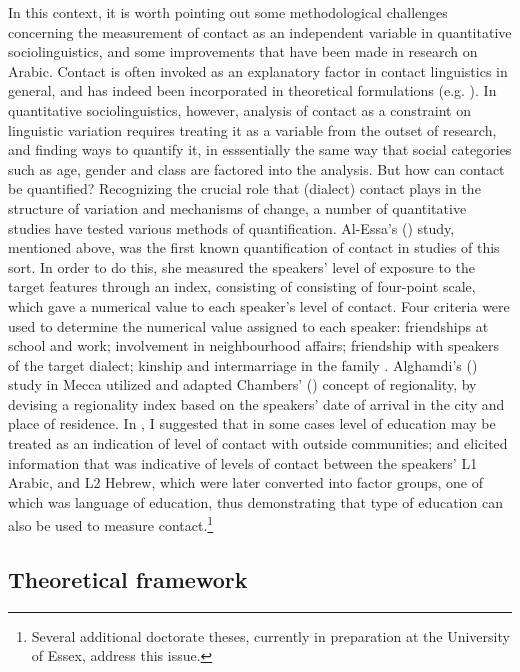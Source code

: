 \documentclass[output=paper]{langsci/langscibook}
\begin{document}
In this context, it is worth pointing out some methodological challenges concerning the measurement of contact as an independent variable in quantitative sociolinguistics, and some improvements that have been made in research on Arabic. Contact is often invoked as an explanatory factor in contact linguistics in general, and has indeed been incorporated in theoretical formulations (e.g. \citealt{ThomasonKaufman1988}). In quantitative sociolinguistics, however, analysis of contact as a constraint on linguistic variation requires treating it as a variable from the outset of research, and finding ways to quantify it, in esssentially the same way that social categories such as age, gender and class are factored into the analysis. But how can contact be quantified? Recognizing the crucial role that (dialect) contact plays in the structure of variation and mechanisms of change, a number of quantitative studies have tested various methods of quantification. Al-Essa's (\citeyear{Al-Essa2009}) study, mentioned above, was the first known quantification of contact in studies of this sort. In order to do this, she measured the speakers’ level of exposure to the target features through an index, consisting of consisting of four-point scale, which gave a numerical value to each speaker’s level of contact. Four criteria were used to determine the numerical value assigned to each speaker: friendships at school and work; involvement in neighbourhood affairs; friendship with speakers of the target dialect; kinship and intermarriage in the family \citep[208]{Al-Essa2009}. Alghamdi's (\citeyear{Alghamdi2014}) study in Mecca utilized and adapted Chambers' (\citeyear{Chambers2000}) concept of regionality, by devising a regionality index based on the speakers’ date of arrival in the city and place of residence. In \citet{Al-Wer2002}, I suggested that in some cases level of education may be treated as an indication of level of contact with outside communities; and \citet{Horesh2014} elicited information that was indicative of levels of contact between the speakers’ L1 Arabic, and L2 Hebrew, which were later converted into factor groups, one of which was language of education, thus demonstrating that type of education can also be used to measure contact.\footnote{Several additional doctorate theses, currently in preparation at the University of Essex, address this issue.}

\subsection{Theoretical framework}
\end{document}
